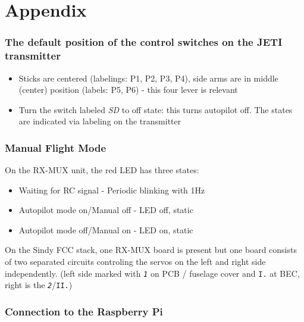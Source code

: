 	\section*{Appendix}\label{appendix}
	
	\subsubsection*{The default position of the control switches on the JETI
	transmitter}\label{the-default-position-of-the-control-switches-on-the-jeti-transmitter}
	
	\begin{itemize}
	\itemsep1pt\parskip0pt
	\item
	  Sticks are centered (labelings: P1, P2, P3, P4), side arms are in
	  middle (center) position (labels: P5, P6) - this four lever is
	  relevant
	\item
	  Turn the switch labeled \emph{SD} to off state: this turns autopilot
	  off. The states are indicated via labeling on the transmitter
	\end{itemize}
	
	\subsubsection*{Manual Flight Mode}\label{manual-flight-mode}
	
	On the RX-MUX unit, the red LED has three states:
	
	\begin{itemize}
	\itemsep1pt\parskip0pt
	\item
	  Waiting for RC signal - Periodic blinking with 1Hz
	\item
	  Autopilot mode on/Manual off - LED off, static
	\item
	  Autopilot mode off/Manual on - LED on, static
	\end{itemize}
	
	On the Sindy FCC stack, one RX-MUX board is present but one board
	consists of two separated circuits controling the servos on the left and
	right side independently. (left side marked with \emph{\texttt{1}} on
	PCB / fuselage cover and \texttt{I.} at BEC, right is the
	\emph{\texttt{2}}/\texttt{II.})
	
	\subsubsection*{Connection to the Raspberry
	Pi}\label{connection-to-the-raspberry-pi}
	

